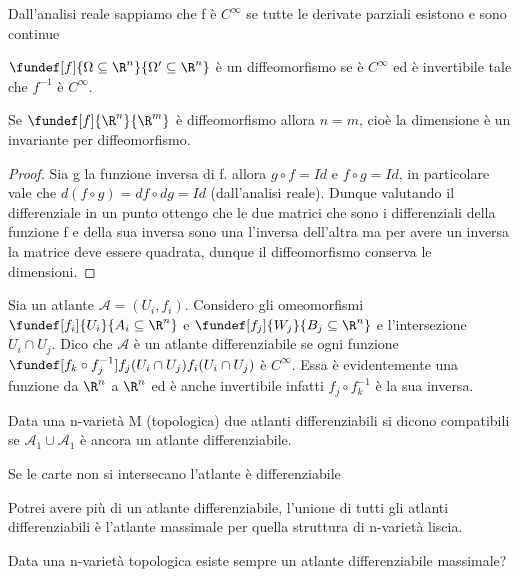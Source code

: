 \begin{oss}
\begin{defn}
\end{defn}
\begin{defn}
Dall'analisi reale sappiamo che f è $C^{\infty}$ se tutte le derivate parziali esistono e sono continue
\end{defn}
\begin{defn}[Diffeomorfismo]
$\fundef[f]{\Omega \subseteq \R^n}{\Omega' \subseteq \R^n}$ è un diffeomorfismo se è $C^\infty$ ed è invertibile tale che $f^{-1}$ è $C^{\infty}$.
\end{defn}
\begin{prop}
Se $\fundef[f]{\R^n}{\R^m}$ è diffeomorfismo allora $n = m$, cioè la dimensione è un invariante per diffeomorfismo.
\end{prop}
\begin{proof}
Sia g la funzione inversa di f. allora $g \circ f = Id$ e $f \circ g = Id$, in particolare vale che $d(f \circ g) = df \circ dg = Id$ (dall'analisi reale). Dunque valutando il differenziale in un punto ottengo che le due matrici che sono i differenziali della funzione f e della sua inversa sono una l'inversa dell'altra ma per avere un inversa la matrice deve essere quadrata, dunque il diffeomorfismo conserva le dimensioni.
\end{proof}
\begin{defn}
Sia un atlante $\mathcal{A} = {(U_i, f_i)}$. Considero gli omeomorfismi
$\fundef[f_i]{U_i}{A_i \subseteq \R^n }$ e $\fundef[f_j]{W_j}{B_j\subseteq \R^n}$ e l'intersezione 
$U_i \cap U_j$. Dico che $\mathcal{A}$ è un atlante differenziabile se ogni funzione $\fundef[f_k \circ f_j^{-1}]{f_j(U_i \cap U_j)}{f_i(U_i \cap U_j)}$ è $C^{\infty}$. Essa è evidentemente una funzione da $\R^n$ a $\R^n$ ed è anche invertibile infatti $f_j \circ f_k^{-1}$ è la sua inversa.
\end{defn}
\begin{defn} 
Data una n-varietà M (topologica) due atlanti differenziabili si dicono compatibili se $\mathcal{A}_1 \cup \mathcal{A}_1$ è ancora un atlante differenziabile.
\end{defn}
\begin{oss}
Se le carte non si intersecano l'atlante è differenziabile
\end{oss}
\begin{oss}
Potrei avere più di un atlante differenziabile, l'unione di tutti gli atlanti differenziabili è l'atlante massimale per quella struttura di n-varietà liscia.
\end{oss}
\begin{oss}
\end{oss}
Data una n-varietà topologica esiste sempre un atlante differenziabile massimale?
\end{oss}